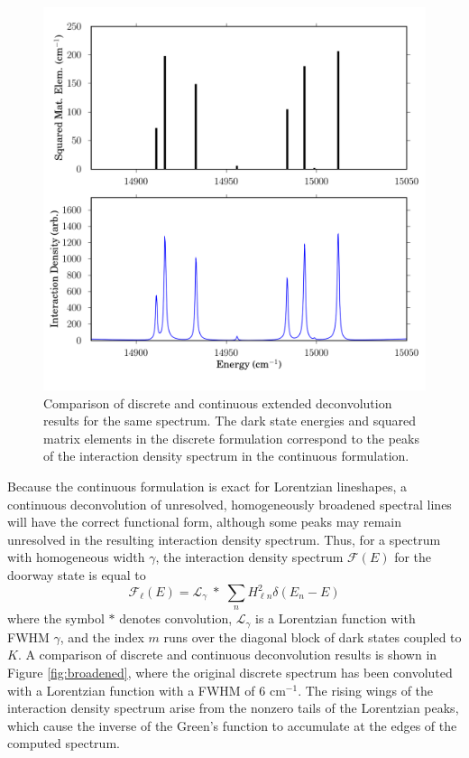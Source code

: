 \begin{figure}
  \caption{Comparison of discrete and continuous extended
    deconvolution results for the same spectrum.  The dark state
    energies and squared matrix elements in the discrete formulation
    correspond to the peaks of the interaction density spectrum in the
    continuous formulation.}
  \label{fig:compare-dark}
  \centering
  \includegraphics[width=6in]{smalley-compare-fwhm1.png}
\end{figure}

Because the continuous formulation is exact for Lorentzian lineshapes,
a continuous deconvolution of unresolved, homogeneously broadened
spectral lines will have the correct functional form, although some
peaks may remain unresolved in the resulting interaction density
spectrum.  Thus, for a spectrum with homogeneous width $\gamma$, the
interaction density spectrum $\mathcal{F}(E)$ for the doorway state is
equal to
\begin{equation}
  \mathcal{F}_{\ell}(E) = 
    \mathcal{L}_{\gamma} \; * \;
    \sum_n H_{\ell n}^2 \delta(E_n - E)
\end{equation}
where the symbol $*$ denotes convolution, $\mathcal{L}_{\gamma}$ is a
Lorentzian function with FWHM $\gamma$, and the index $m$ runs over
the diagonal block of dark states coupled to $K$.  A comparison of
discrete and continuous deconvolution results is shown in Figure
\ref{fig:broadened}, where the original discrete spectrum has been
convoluted with a Lorentzian function with a FWHM of 6 cm$^{-1}$.  The
rising wings of the interaction density spectrum arise from the
nonzero tails of the Lorentzian peaks, which cause the inverse of the
Green's function to accumulate at the edges of the computed spectrum.

